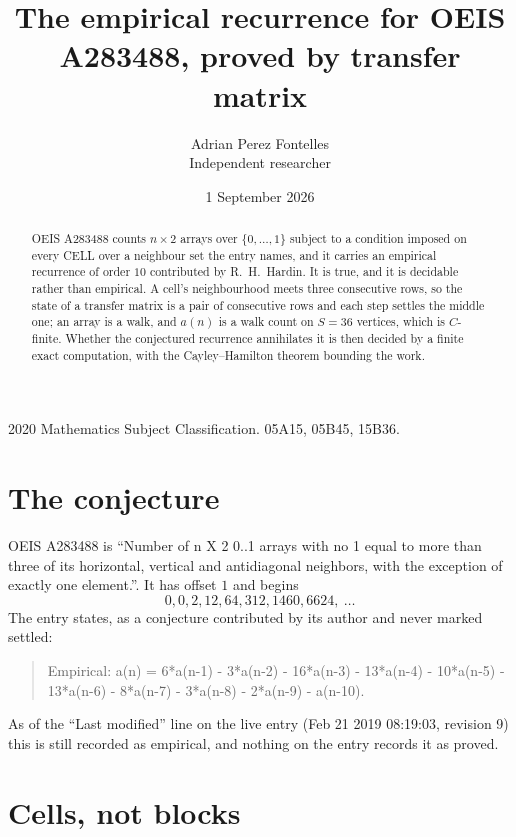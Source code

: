 \documentclass[11pt,a4paper]{article}
\title{The empirical recurrence for OEIS A283488, proved by transfer matrix}
\author{Adrian Perez Fontelles\\ \small Independent researcher}
\date{1 September 2026}
\theoremstyle{plain}
\theoremstyle{definition}
\begin{document}
\maketitle

\begin{abstract}
OEIS A283488 counts $n\times2$ arrays over $\{0,\dots,1\}$ subject to a condition imposed on
every CELL over a neighbour set the entry names, and it carries an empirical recurrence of
order $10$ contributed by R.~H.~Hardin. It is true, and it is decidable rather than
empirical. A cell's neighbourhood meets three consecutive rows, so the state of a transfer
matrix is a pair of consecutive rows and each step settles the middle one; an array is a
walk, and $a(n)$ is a walk count on $S=36$ vertices, which is $C$-finite. Whether the
conjectured recurrence annihilates it is then decided by a finite exact computation, with the
Cayley--Hamilton theorem bounding the work.
\end{abstract}

\noindent\small 2020 Mathematics Subject Classification. 05A15, 05B45, 15B36.\normalsize

\section{The conjecture}

OEIS A283488 is ``Number of n X 2 0..1 arrays with no 1 equal to more than three of its horizontal, vertical and antidiagonal neighbors, with the exception of exactly one element.''. It has offset $1$ and begins
\[
0, 0, 2, 12, 64, 312, 1460, 6624,\ \dots
\]
The entry states, as a conjecture contributed by its author and never marked settled:
\begin{quote}
Empirical: a(n) = 6*a(n-1) - 3*a(n-2) - 16*a(n-3) - 13*a(n-4) - 10*a(n-5) - 13*a(n-6) - 8*a(n-7) - 3*a(n-8) - 2*a(n-9) - a(n-10).
\end{quote}
As of the ``Last modified'' line on the live entry (Feb 21 2019 08:19:03, revision 9) this is still
recorded as empirical, and nothing on the entry records it as proved.

\section{Cells, not blocks}
\end{document}
